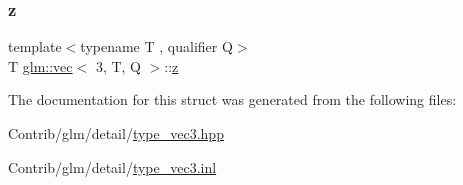 \subsubsection{\texorpdfstring{z}{z}}
{\footnotesize\ttfamily template$<$typename T , qualifier Q$>$ \\
T \mbox{\hyperlink{structglm_1_1vec}{glm\+::vec}}$<$ 3, T, Q $>$\+::\mbox{\hyperlink{_s_d_l__opengl__glext_8h_a5e74030ebb3297ce1b37ff716fedd68f}{z}}}



The documentation for this struct was generated from the following files\+:\begin{DoxyCompactItemize}
\item 
Contrib/glm/detail/\mbox{\hyperlink{type__vec3_8hpp}{type\+\_\+vec3.\+hpp}}\item 
Contrib/glm/detail/\mbox{\hyperlink{type__vec3_8inl}{type\+\_\+vec3.\+inl}}\end{DoxyCompactItemize}
